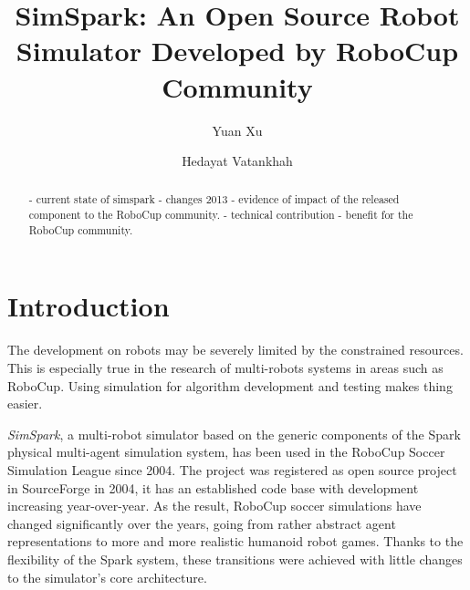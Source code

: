 \documentclass{llncs}
\begin{document}
\title{SimSpark: An Open Source Robot Simulator Developed by RoboCup Community}

\author{Yuan Xu \and Hedayat Vatankhah}


\maketitle

\begin{abstract}
  - current state of simspark
  - changes 2013
  - evidence of impact of the released component to the RoboCup community.
  - technical contribution
  - benefit for the RoboCup community.
\end{abstract}

\section{Introduction}
The development on robots may be severely limited by the constrained resources.
This is especially true in the research of multi-robots systems in areas such as RoboCup.
Using simulation for algorithm development and testing makes thing easier.

\textit{SimSpark}, a multi-robot simulator based on the generic components of the Spark\cite{OR05} physical multi-agent simulation system, has been used in the RoboCup Soccer Simulation League since 2004.
The project was registered as open source project in SourceForge in 2004, it has an established code base with development increasing year-over-year.
As the result, RoboCup soccer simulations have changed significantly over the years, going from rather abstract agent representations to more and more realistic humanoid robot games\cite{Boedecker2008,usermanual}.
Thanks to the flexibility of the Spark system, these transitions were achieved with little changes to the simulator’s core architecture.
\end{document}
